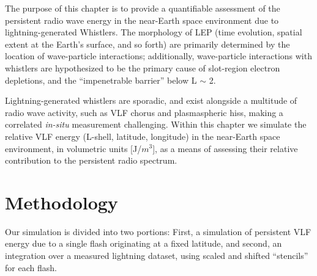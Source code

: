 The purpose of this chapter is to provide a quantifiable assessment of the persistent radio wave energy in the near-Earth space environment due to lightning-generated Whistlers. The morphology of LEP (time evolution, spatial extent at the Earth's surface, and so forth) are primarily determined by the location of wave-particle interactions; additionally, wave-particle interactions with whistlers are hypothesized to be the primary cause of slot-region electron depletions, and the ``impenetrable barrier'' below L $\sim$ 2.

Lightning-generated whistlers are sporadic, and exist alongside a multitude of radio wave activity, such as VLF chorus and plasmaspheric hiss, making a correlated \emph{in-situ} measurement challenging. Within this chapter we simulate the relative VLF energy (L-shell, latitude, longitude) in the near-Earth space environment, in volumetric units [J/$m^3$], as a means of assessing their relative contribution to the persistent radio spectrum.


\section{Methodology}
Our simulation is divided into two portions: First, a simulation of persistent VLF energy due to a single flash originating at a fixed latitude, and second, an integration over a measured lightning dataset, using scaled and shifted ``stencils'' for each flash.

